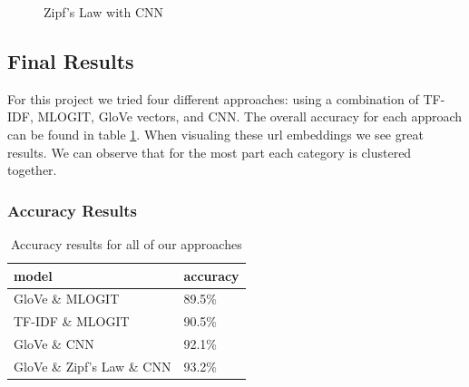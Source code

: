 \documentclass[12pt]{article}
\begin{document}
\begin{figure}[ht!]%
\centering
    \caption{Zipf's Law with CNN}%
    \label{fig:example}%
\end{figure}


\begin{center}
\subsection{Final Results}
\end{center}

For this project we tried four different approaches: using a combination of TF-IDF, MLOGIT, GloVe vectors, and CNN.
The overall accuracy for each approach can be found in table \ref{table_acc_overall}. When visualing these url embeddings we see great results. We can observe that for the most part each category is clustered together. 
\newpage
\subsubsection{Accuracy Results}

\begin{table}[ht!]
\centering
\begin{tabular}{l|l}
model & accuracy \\
\hline
GloVe \& MLOGIT & 89.5\% \\
TF-IDF \& MLOGIT & 90.5\%  \\
GloVe \& CNN & 92.1\%  \\
GloVe \& Zipf's Law \& CNN & 93.2\%  \\
\end{tabular}
\caption{Accuracy results for all of our approaches}
\label{table_acc_overall}
\end{table}
\end{document}
